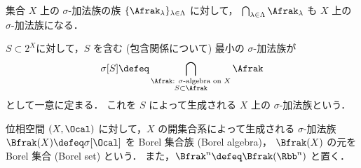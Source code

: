 \begin{example}
    集合 $X$ 上の $\sigma$-加法族の族 $\{\Afrak_\lambda\}_{\lambda\in\Lambda}$ に対して，
        $\bigcap_{\lambda\in\Lambda}\Afrak_\lambda$
    も $X$ 上の $\sigma$-加法族になる．

    $S\subset 2^X$に対して，$S$ を含む (包含関係について) 最小の $\sigma$-加法族が
    \begin{align*}
        \sigma[S]\defeq\bigcap_{\substack{\text{$\Afrak$: $\sigma$-algebra on $X$}\\S\subset\Afrak}}\Afrak
    \end{align*}
    として一意に定まる．
    これを $S$ によって生成される $X$ 上の $\sigma$-加法族という．
\end{example}

\begin{example}\label{ex:Borel_algebra}
    位相空間 $(X,\Ocal)$ に対して，$X$ の開集合系によって生成される $\sigma$-加法族
    $\Bfrak(X)\defeq\sigma[\Ocal]$ を Borel 集合族 (Borel algebra)，
    $\Bfrak(X)$ の元を Borel 集合 (Borel set) という．
    また，$\Bfrak^n\defeq\Bfrak(\Rbb^n)$ と置く．
\end{example}

